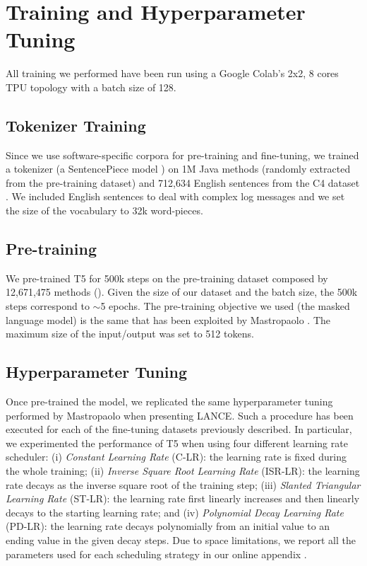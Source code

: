 \section{Training and Hyperparameter Tuning} \label{sec:training}
All training we performed have been run using a Google Colab's 2x2, 8 cores TPU topology with a batch size of 128.

\subsection{Tokenizer Training}
Since we use software-specific corpora for pre-training and fine-tuning, we trained a tokenizer (\ie a SentencePiece model \cite{kudo2018sentencepiece}) on 1M Java methods (randomly extracted from the pre-training dataset) and 712,634 English sentences from the C4 dataset \cite{raffel2019exploring}. We included English sentences to deal with complex log messages and we set the size of the vocabulary to 32k word-pieces. 

\subsection{Pre-training}
We pre-trained T5 for 500k steps on the pre-training dataset composed by 12,671,475 \java methods (). Given the size of our dataset and the batch size, the 500k steps correspond to $\sim$5 epochs. The pre-training objective we used (\ie the masked language model) is the same that has been exploited by Mastropaolo \etal \cite{mastropaolo2022using}. The maximum size of the input/output was set to 512 tokens.

\subsection{Hyperparameter Tuning}
Once pre-trained the model, we replicated the same hyperparameter tuning performed by Mastropaolo \etal \cite{mastropaolo2021studying} when presenting LANCE. Such a procedure has been executed for each of the fine-tuning datasets previously described. In particular, we experimented the performance of T5 when using four different learning rate scheduler: (i) \textit{Constant Learning Rate} (C-LR): the learning rate is fixed during the whole training; (ii) \textit{Inverse Square Root Learning Rate} (ISR-LR): the learning rate decays as the inverse square root of the training step; (iii) \textit{Slanted Triangular Learning Rate \cite{howard2018universal}} (ST-LR): the learning rate first linearly increases and then linearly decays to the starting learning rate; and (iv) \textit{Polynomial Decay Learning Rate} (PD-LR): the learning rate decays polynomially from an initial value to an ending value in the given decay steps. Due to space limitations, we report all the parameters used for each scheduling strategy in our online appendix \cite{replication}.

